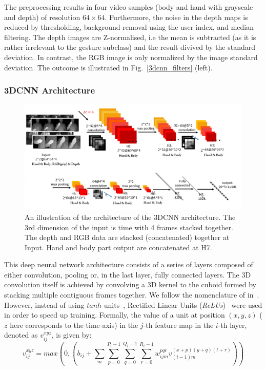 The preprocessing results in four video samples (body and hand with grayscale and depth) of resolution $64\times64$. Furthermore, the noise in the depth maps is reduced by thresholding, background removal using the user index, and median filtering.
%
The depth images are Z-normalised, i.e the mean is subtracted (as it is rather irrelevant to the gesture subclass) and 
the result divived by the standard deviation.
%
In contrast, the RGB image is only normalized by the image standard deviation.
The outcome is illustrated in Fig.~\ref{3dcnn_filters} (left).


\subsubsection{3DCNN Architecture}
\begin{figure}[t]
  \centering
  \includegraphics[width=.9\textwidth]{images/3DCNN_new}
  \caption{An illustration of the architecture of the 3DCNN architecture. The 3rd dimension of the input is time with 4 frames stacked together. The depth and RGB data are stacked (concatenated) together at Input. Hand and body part output are concatenated at H7.}\label{3dcnn_architecture}
\end{figure}

This deep neural network architecture consists of a series of layers composed of either convolution, pooling or, in the last layer, fully connected layers.
The 3D convolution itself is achieved by convolving a 3D kernel to the cuboid formed by stacking multiple contiguous frames together. We follow the nomenclature of in~\cite{ji20133d}.
 However, instead of using $tanh$ units~\cite{ji20133d},  Rectified Linear Units (\emph{ReLUs})~\cite{krizhevsky2012imagenet} were used in order to speed up training.
 Formally, the value of a unit at position $(x, y, z)$ ($z$ here corresponds to the time-axis) in the $j$-th feature map in the $i$-th layer, denoted as $v^{xyz}_{ij}$, is given by:
\begin{equation}
v^{xyz}_{ij} =  max( 0,  ( b_{ij} + \sum_m \sum_{p=0}^{P_i - 1} \sum_{q=0}^{Q_i -1 } \sum_{r=0}^{R_i -1} w^{pqr}_{ijm} v^{(x+p)(y+q)(t+r)}_{(i-1)m} ))
\label{ReLU}
\end{equation}

